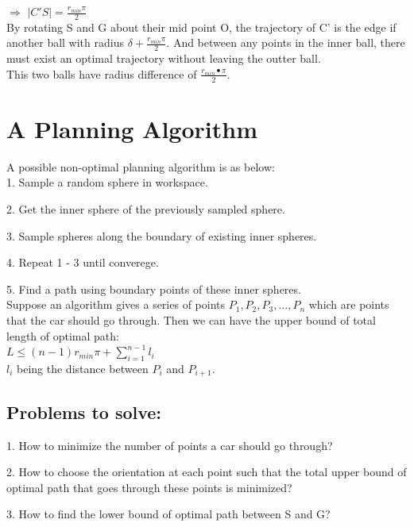 \documentclass[12pt]{article}
\begin{document}
  $\Longrightarrow$ $|C'S| = \frac{r_{min}\pi}{2}$\\
  
  By rotating S and G about their mid point O, the trajectory of C' is the edge if another ball with radius $\delta + \frac{r_{min}\pi}{2}$. And between any points in the inner ball, there must exist an optimal trajectory without leaving the outter ball. \\
  
  This two balls have radius difference of $\frac{r_{min}•\pi}{2}$.\\
  
  \section{A Planning Algorithm}
  A possible non-optimal planning algorithm is as below:\\
  
  1. Sample a random sphere in workspace.
  
  2. Get the inner sphere of the previously sampled sphere.
  
  3. Sample spheres along the boundary of existing inner spheres.
  
  4. Repeat 1 - 3 until converege.
  
  5. Find a path using boundary points of these inner spheres.\\
  
  Suppose an algorithm gives a series of points $P_{1}, P_{2}, P_{3},...,P_{n}$ which are points that the car should go through. Then we can have the upper bound of total length of optimal path:\\
  $L \leq (n-1)r_{min}\pi + \sum_{i=1}^{n-1}l_{i}$\\
  $l_{i}$ being the distance between $P_{i}$ and $P_{i+1}$.\\
  
  \subsection{Problems to solve:}

  1. How to minimize the number of points a car should go through?
  
  2. How to choose the orientation at each point such that the total upper bound of optimal path that goes through these points is minimized? 
  
  3. How to find the lower bound of optimal path between S and G?
  
\end{document}
